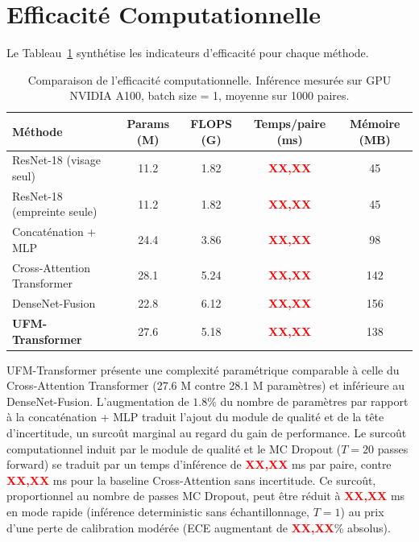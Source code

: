 \documentclass[12pt,a4paper]{report}
\begin{document}
\section{Efficacit\'{e} Computationnelle}
\label{sec:efficacite}

Le Tableau~\ref{tab:efficacite} synth\'{e}tise les indicateurs d'efficacit\'{e} pour chaque m\'{e}thode.

\begin{table}[htbp]
    \centering
    \caption{Comparaison de l'efficacit\'{e} computationnelle. Inf\'{e}rence mesur\'{e}e sur GPU NVIDIA A100, batch size = 1, moyenne sur 1000 paires.}
    \label{tab:efficacite}
    \begin{tabular}{lcccc}
        \hline
        \hline
        \textbf{M\'{e}thode} & \textbf{Params (M)} & \textbf{FLOPS (G)} & \textbf{Temps/paire (ms)} & \textbf{M\'{e}moire (MB)} \\
        \hline
        ResNet-18 (visage seul) & 11.2 & 1.82 & \textcolor{red}{\textbf{XX,XX}} & 45 \\
        ResNet-18 (empreinte seule) & 11.2 & 1.82 & \textcolor{red}{\textbf{XX,XX}} & 45 \\
        Concat\'{e}nation + MLP & 24.4 & 3.86 & \textcolor{red}{\textbf{XX,XX}} & 98 \\
        Cross-Attention Transformer & 28.1 & 5.24 & \textcolor{red}{\textbf{XX,XX}} & 142 \\
        DenseNet-Fusion & 22.8 & 6.12 & \textcolor{red}{\textbf{XX,XX}} & 156 \\
        \rowcolor{gray!15}
        \textbf{UFM-Transformer} & 27.6 & 5.18 & \textcolor{red}{\textbf{XX,XX}} & 138 \\
        \hline
        \hline
    \end{tabular}
\end{table}


UFM-Transformer pr\'{e}sente une complexit\'{e} param\'{e}trique comparable \`{a} celle du Cross-Attention Transformer (27.6 M contre 28.1 M param\`{e}tres) et inf\'{e}rieure au DenseNet-Fusion. L'augmentation de $1.8$\% du nombre de param\`{e}tres par rapport \`{a} la concat\'{e}nation + MLP traduit l'ajout du module de qualit\'{e} et de la t\^{e}te d'incertitude, un surco\^{u}t marginal au regard du gain de performance. Le surco\^{u}t computationnel induit par le module de qualit\'{e} et le MC Dropout ($T = 20$ passes forward) se traduit par un temps d'inf\'{e}rence de \textcolor{red}{\textbf{XX,XX}} ms par paire, contre \textcolor{red}{\textbf{XX,XX}} ms pour la baseline Cross-Attention sans incertitude. Ce surco\^{u}t, proportionnel au nombre de passes MC Dropout, peut \^{e}tre r\'{e}duit \`{a} \textcolor{red}{\textbf{XX,XX}} ms en mode rapide (inf\'{e}rence deterministic sans \'{e}chantillonnage, $T = 1$) au prix d'une perte de calibration mod\'{e}r\'{e}e (ECE augmentant de \textcolor{red}{\textbf{XX,XX}}\% absolus).
\end{document}
